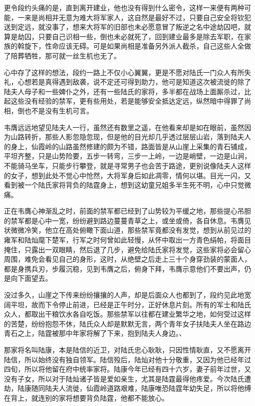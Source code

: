 更令段约头痛的是，直到离开建业，他也没有得到什么密令，这样一来便有两种可能，一来是尚相并无意为难大将军家人，这自然是最好不过，只要自己安全将钦犯送到定远，就没事了，想来大将军的旧部也未必愿意冒了叛逆之名中途劫囚吧，就算是劫囚，只要自己识相一些，倒也未必就死了，回到建业最多是除去军职，在家族的斡旋下，性命应该无碍。可是如果尚相是准备另外派人截杀，自己这些人全做了陪葬牺牲，那可就一丝生机也无了。

心中存了这样的想法，段约一路上不仅小心翼翼，更是不愿对陆氏一门众人有所失礼，心想若是真得遇到敌袭，说不定还可得到助力，他可是知道这次被流徙的除了陆夫人母子和一些婢仆之外，还有一些陆氏的家将，多半都在战场上面厮杀过，比起这些没有经验的禁军，更有些用处，若是能够安全抵达定远，纵然暗中得罪了尚相，倒也不是没有生机可言。

韦膺远远地望见陆夫人一行，虽然还有数里之遥，在他看来却是如在眼前，虽然因为山路转折，那些人影忽隐忽现，但是他的目光却几乎透过层层山岩，落到陆夫人的身上，仙霞岭的山路虽然修建的颇为不错，路面皆是从山崖上采集的青石铺成，平坦齐整，只是山势险要，五步一转弯，三步一上岭，一边是峭壁，一边是山涧，不能骑马坐车，只能步行攀登，就是寻常男子也会苦于路途，更别说像陆夫人这样的女子，想到此处不觉心中怆然，大将军身后如此凋零，情何以堪。目光一闪，又看到被一个陆氏家将背负的陆霆身上，想到这幼童兄姐多半生死不明，心中只觉微痛。

正在韦膺心神渐乱之时，前面的禁军都已经到了山势较为平缓之地，那些提心吊胆的禁军都是心中一宽，纷纷避到路边蔓蔓青草之上，或坐或倚，各自休息。韦膺见状微微冷笑，他立在高处俯瞰下面山道，那些禁军竟都没有发觉，想到从前见过的雍军和陆灿麾下楚军，行军之时何曾如此轻慢，从怀中取出一方青色绢帕，将面目掩住，只露出一双眼睛，然后退了几步，避免给陆氏家将发觉，这些家将必会留心周围，难免会看见自己的身形，这时，从绝壁之后走上三十个身穿劲装的蒙面人，都是身携兵刃，步履沉稳，见到韦膺之后，俯身下拜，韦膺示意他们不要出声，仍是向下面望去。

没过多久，山崖之下传来纷纷攘攘的人声，却是后面众人也都到了，段约见此地宽阔平坦，故而下令停止前进，已经是正午时分，正好休息片刻。所有的军士和陆氏众人，都取出干粮饮水各自吃饭。那些禁军以往都在建业繁华之地，如何受过这样的苦楚，纷纷抱怨不休，陆氏众人却是默默无言，两个青年女子扶陆夫人坐在路边青石之上，陆霆被那中年家将解了下来，抱到陆夫人身边。、

那家将名叫陆康，本是陆信的近卫，对陆氏忠心耿耿，只因性情耿直，又不愿离开陆信，所以始终没有独自领军。陆信殁后，陆灿对他十分敬重，又因为他已经年过四旬，所以将他留在府中统率家将。陆康今年已经有四十六岁，妻子前年过世，又没有子女，所以对于陆灿诸子皆是爱如亲生，尤其是陆霆最得他疼爱。今次陆氏遭劫，陆康随同陆夫人流徙，仙霞岭道路艰难，陆康唯恐陆霆年幼失足，所以将他缚在背上，就连别的家将想要背负陆霆，他都不能放心。

